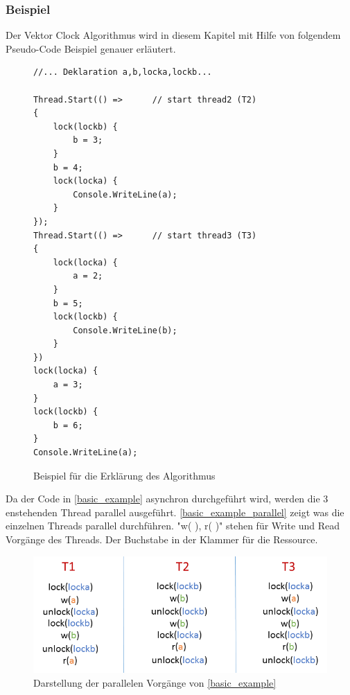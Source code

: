 \documentclass[10pt,a4paper]{article}
\begin{document}
\subsubsection{Beispiel}\label{example}
\begin{flushleft}
Der Vektor Clock Algorithmus wird in diesem Kapitel mit Hilfe von folgendem Pseudo-Code Beispiel genauer erläutert.\\
\begin{figure}[H]
\begin{singlespace}
\begin{lstlisting}
//... Deklaration a,b,locka,lockb...

Thread.Start(() =>		// start thread2 (T2)
{
	lock(lockb) {
		b = 3;
	}
	b = 4;
	lock(locka) {
		Console.WriteLine(a);
	}
});
Thread.Start(() =>		// start thread3 (T3)
{
	lock(locka) {
		a = 2;
	}
	b = 5;
	lock(lockb) {
		Console.WriteLine(b);
	}
})
lock(locka) {
	a = 3;
}
lock(lockb) {
	b = 6;
}
Console.WriteLine(a);
\end{lstlisting}
\end{singlespace}
\caption{Beispiel für die Erklärung des Algorithmus}\label{basic_example}
\end{figure}
Da der Code in \autoref{basic_example} asynchron durchgeführt wird, werden die 3 enstehenden Thread parallel ausgeführt. \autoref{basic_example_parallel} zeigt was die einzelnen Threads parallel durchführen. "w( ), r( )" stehen für Write und Read Vorgänge des Threads. Der Buchstabe in der Klammer für die Ressource.
\begin{figure}[H]
\centering
\includegraphics[scale=0.4]{images/VectorCheckingAlgorithm.png}
\caption{Darstellung der parallelen Vorgänge von \autoref{basic_example}}
\label{basic_example_parallel}
\end{figure}
\end{flushleft}
\newpage
\end{document}
